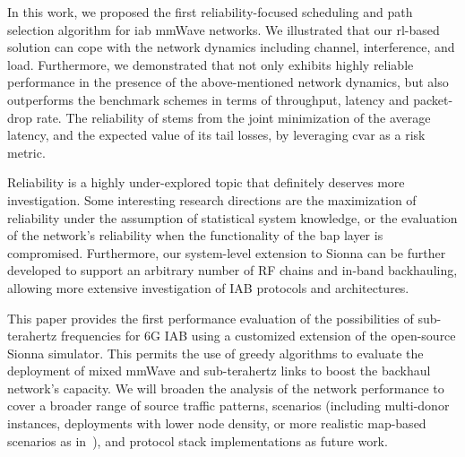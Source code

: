 
In this work, we proposed the first reliability-focused scheduling and path selection algorithm for \gls{iab} mmWave networks. We illustrated that our \gls{rl}-based solution can cope with the network dynamics including channel, interference, and load.  Furthermore, we demonstrated that \name{} not only  exhibits highly reliable performance in the presence of the above-mentioned network dynamics, but also outperforms the benchmark schemes in terms of throughput, latency and packet-drop rate. The reliability of \name{} stems from the joint minimization of the average latency, and the expected value of its tail losses, by leveraging \gls{cvar} as a risk metric.

Reliability is a highly under-explored topic that definitely deserves more investigation. Some interesting research directions are the maximization of reliability under the assumption of statistical system knowledge, or the evaluation of the network's reliability when the functionality of the \gls{bap} layer is compromised.
Furthermore, our system-level extension to Sionna can be further developed to support an arbitrary number of RF chains and in-band backhauling, allowing more extensive investigation of IAB protocols and architectures.



This paper provides the first performance evaluation of the possibilities of sub-terahertz frequencies for 6G IAB using a customized extension of the open-source Sionna simulator. This permits the use of greedy algorithms to evaluate the deployment of mixed mmWave and sub-terahertz links to boost the backhaul network's capacity.
We will broaden the analysis of the network performance to cover a broader range of source traffic patterns, scenarios (including multi-donor instances, deployments with lower node density, or more realistic map-based scenarios as in~\cite{gemmi2023on,gemmi2022on}), and protocol stack implementations as future work.